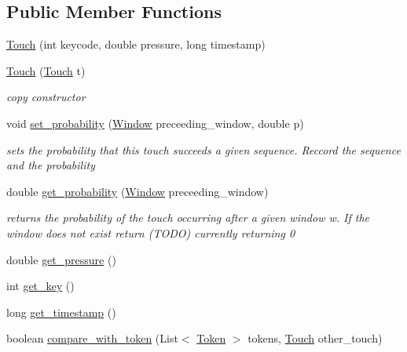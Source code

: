 \subsection*{Public Member Functions}
\begin{DoxyCompactItemize}
\item 
\hyperlink{classcomponents_1_1_touch_abb291d0bd5aa18b2fbec3bf1d0d3f3fa}{Touch} (int keycode, double pressure, long timestamp)
\item 
\hyperlink{classcomponents_1_1_touch_a371ee9fd78523d19ee3b3ab9b57f5aff}{Touch} (\hyperlink{classcomponents_1_1_touch}{Touch} t)
\begin{DoxyCompactList}\small\item\em copy constructor \end{DoxyCompactList}\item 
void \hyperlink{classcomponents_1_1_touch_a407c6a87b0109d73ac0c84c32a38caf4}{set\+\_\+probability} (\hyperlink{classcomponents_1_1_window}{Window} preceeding\+\_\+window, double p)
\begin{DoxyCompactList}\small\item\em sets the probability that this touch succeeds a given sequence. Reccord the sequence and the probability \end{DoxyCompactList}\item 
double \hyperlink{classcomponents_1_1_touch_aa7eaadaf00950e7e7076136be30d00bd}{get\+\_\+probability} (\hyperlink{classcomponents_1_1_window}{Window} preceeding\+\_\+window)
\begin{DoxyCompactList}\small\item\em returns the probability of the touch occurring after a given window w. If the window does not exist return (T\+O\+DO) currently returning 0 \end{DoxyCompactList}\item 
double \hyperlink{classcomponents_1_1_touch_aa47273ddf1ef9ed00285bcee6cfd4eba}{get\+\_\+pressure} ()
\item 
int \hyperlink{classcomponents_1_1_touch_a7c61094e11f0dfeaf37e72a67fd04121}{get\+\_\+key} ()
\item 
long \hyperlink{classcomponents_1_1_touch_aab5b8034bd2970c1d7a2169adfcf53e6}{get\+\_\+timestamp} ()
\item 
boolean \hyperlink{classcomponents_1_1_touch_a7cb910d6f460cc8ba5f101786131e07d}{compare\+\_\+with\+\_\+token} (List$<$ \hyperlink{classcomponents_1_1_token}{Token} $>$ tokens, \hyperlink{classcomponents_1_1_touch}{Touch} other\+\_\+touch)
\item 

\end{DoxyCompactItemize}
